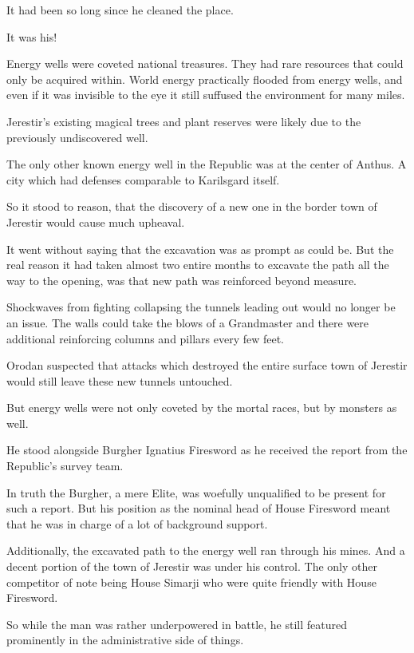 \documentclass[a4paper,10pt]{book}
\begin{document}
It had been so long since he cleaned the place.\par
It was his!\par
\par
Energy wells were coveted national treasures. They had rare resources that could only be acquired within. World energy practically flooded from energy wells, and even if it was invisible to the eye it still suffused the environment for many miles.\par
Jerestir’s existing magical trees and plant reserves were likely due to the previously undiscovered well.\par
The only other known energy well in the Republic was at the center of Anthus. A city which had defenses comparable to Karilsgard itself.\par
So it stood to reason, that the discovery of a new one in the border town of Jerestir would cause much upheaval.\par
It went without saying that the excavation was as prompt as could be. But the real reason it had taken almost two entire months to excavate the path all the way to the opening, was that new path was reinforced beyond measure.\par
Shockwaves from fighting collapsing the tunnels leading out would no longer be an issue. The walls could take the blows of a Grandmaster and there were additional reinforcing columns and pillars every few feet.\par
Orodan suspected that attacks which destroyed the entire surface town of Jerestir would still leave these new tunnels untouched.\par
But energy wells were not only coveted by the mortal races, but by monsters as well.\par
He stood alongside Burgher Ignatius Firesword as he received the report from the Republic’s survey team.\par
In truth the Burgher, a mere Elite, was woefully unqualified to be present for such a report. But his position as the nominal head of House Firesword meant that he was in charge of a lot of background support.\par
Additionally, the excavated path to the energy well ran through his mines. And a decent portion of the town of Jerestir was under his control. The only other competitor of note being House Simarji who were quite friendly with House Firesword.\par
So while the man was rather underpowered in battle, he still featured prominently in the administrative side of things.\par
\end{document}
